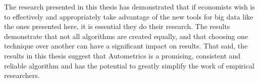 The research presented in this thesis has demonstrated that if economists wish is to effectively and appropriately take advantage of the new tools for big data like the ones presented here, it is essential they do their research. The results demonstrate that not all algorithms are created equally, and that choosing one technique over another can have a significant impact on results. That said, the results in this thesis suggest that Autometrics is a promising, consistent and reliable algorithm and has the potential to greatly simplify the work of empirical researchers. 